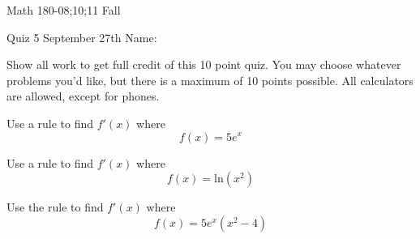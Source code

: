 \documentclass[11pt,epsfig]{article}
\begin{document}
Math 180-08;10;11 Fall

Quiz 5 September 27th \hspace{1.9in} {Name:} {\underline {\hspace{2.5in}}}
\vspace{2pc}

Show all work to get full credit of this 10 point quiz. You may choose whatever problems you'd like, but there is a maximum of 10 points possible. All calculators are allowed, except for phones.
\vspace{2pc}

\begin{problem}{5}
Use a rule to find $f'(x)$ where
\begin{equation*}
f(x) = 5e^x
\end{equation*}
\vfill
\end{problem}

\begin{problem}{5}
Use a rule to find $f'(x)$ where
\begin{equation*}
f(x) =  \mathrm{ln} (x^2)
\end{equation*}
\vfill
\end{problem}

\newpage

\begin{problem}{10}
Use the rule to find $f'(x)$ where
\begin{equation*}
f(x) = 5e^x (x^2 - 4)
\end{equation*}
\vfill
\end{problem}





\showpoints
\end{document}
